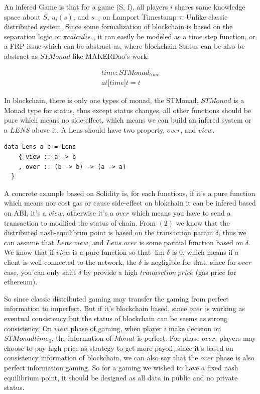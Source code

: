 \documentclass[twocolumn]{article}
\begin{document}
An infered Game is that for a game (S, f), all players $i$ shares same knowledge space about $S$, $u_{i}(s)$, and $s_{-i}$ on  Lamport Timestamp $\tau$.
Unlike classic distributed system,
Since some formalization of blockchain is based on the separation logic or $\pi calculis$ \cite{linearblockchain}, it can easily be modeled as a time step function, or a FRP issue which can be abstract as\cite{ElliottHudak97:Fran}, where blockchain Status can be also be abstract as $STMonad$ like MAKERDao\cite{dai}'s work:

\begin{gather}
  time: STMonad_{time}\\
  at \mathbb{[} time \mathbb{]}t = t
\end{gather}

In blockchain, there is only one types of monad, the STMonad, $STMonad$ is a Monad type for status, thus except status changes, all other functions should be pure which means no side-effect, which means we can build an infered system or a $LENS$\cite {lens} above it. A Lens should have two property, $over$, and $view$. 

\lstset{language=Haskell}
\begin{lstlisting}
data Lens a b = Lens
    { view :: a -> b
    , over :: (b -> b) -> (a -> a)
  }
\end{lstlisting}

A concrete example based on Solidity is, for each functions, if it's a pure function which means nor cost gas or cause side-effect on blokchain it can be infered based on ABI, it's a $view$, otherwise it's a $over$ which means you have to send a transaction to modified the status of chain. From $(2)$ we know that the distributed nash-equilibrim point is based on the transaction param $\delta$, thus we can assume that $Lens.view$, and $Lens.over$ is some paritial function based on $\delta$. We know that if $view$ is a pure function so that $\lim \delta$ is 0, which means if a client is well connected to the network, the $\delta$ is negligible for that, since for $over$ case, you can only shift $\delta$ by provide a high $tranasction\ price$ (gas price for ethereum).


So since classic distributed gaming may transfer the gaming from perfect information to imperfect. But if it's blockchain based, since $over$ is working as eventual consistency\cite{consis} but the status of blockchain can be seems as strong consistency\cite {Consistent}. On $view$ phase of gaming, when player $i$ make decision on $STMonad time_0$, the information of $Monat$ is perfect. For phase $over$, players may choose to pay high price as strategy to get more payoff, since it's based on consistency information of blockchain, we can also say that the $over$ phase is also perfect information gaming. So for a gaming we wished to have a fixed nash equilibrium point, it should be designed as all data in public and no private status.
\end{document}
